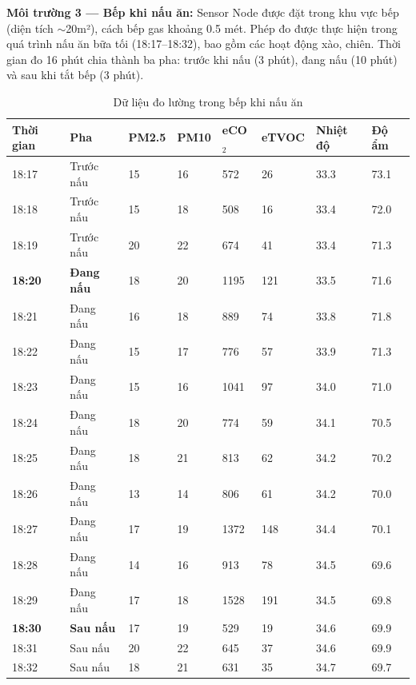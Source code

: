 \documentclass[../DoAn.tex]{subfiles}
\begin{document}
\textbf{Môi trường 3 — Bếp khi nấu ăn:} Sensor Node được đặt trong khu vực bếp (diện tích $\sim$20m²), cách bếp gas khoảng 0.5 mét. Phép đo được thực hiện trong quá trình nấu ăn bữa tối (18:17--18:32), bao gồm các hoạt động xào, chiên. Thời gian đo 16 phút chia thành ba pha: trước khi nấu (3 phút), đang nấu (10 phút) và sau khi tắt bếp (3 phút).

\begin{table}[H]
\centering
\caption{Dữ liệu đo lường trong bếp khi nấu ăn}
\label{table:thuc_nghiem_bep}
\small
\begin{tabularx}{\textwidth}{|X|X|X|X|X|X|X|X|}
\hline
\textbf{Thời gian} & \textbf{Pha} & \textbf{PM2.5} & \textbf{PM10} & \textbf{eCO$_2$} & \textbf{eTVOC} & \textbf{Nhiệt độ} & \textbf{Độ ẩm} \\
\hline
18:17 & Trước nấu & 15 & 16 & 572 & 26 & 33.3 & 73.1 \\
\hline
18:18 & Trước nấu & 15 & 18 & 508 & 16 & 33.4 & 72.0 \\
\hline
18:19 & Trước nấu & 20 & 22 & 674 & 41 & 33.4 & 71.3 \\
\hline
\textbf{18:20} & \textbf{Đang nấu} & 18 & 20 & 1195 & 121 & 33.5 & 71.6 \\
\hline
18:21 & Đang nấu & 16 & 18 & 889 & 74 & 33.8 & 71.8 \\
\hline
18:22 & Đang nấu & 15 & 17 & 776 & 57 & 33.9 & 71.3 \\
\hline
18:23 & Đang nấu & 15 & 16 & 1041 & 97 & 34.0 & 71.0 \\
\hline
18:24 & Đang nấu & 18 & 20 & 774 & 59 & 34.1 & 70.5 \\
\hline
18:25 & Đang nấu & 18 & 21 & 813 & 62 & 34.2 & 70.2 \\
\hline
18:26 & Đang nấu & 13 & 14 & 806 & 61 & 34.2 & 70.0 \\
\hline
18:27 & Đang nấu & 17 & 19 & 1372 & 148 & 34.4 & 70.1 \\
\hline
18:28 & Đang nấu & 14 & 16 & 913 & 78 & 34.5 & 69.6 \\
\hline
18:29 & Đang nấu & 17 & 18 & 1528 & 191 & 34.5 & 69.8 \\
\hline
\textbf{18:30} & \textbf{Sau nấu} & 17 & 19 & 529 & 19 & 34.6 & 69.9 \\
\hline
18:31 & Sau nấu & 20 & 22 & 645 & 37 & 34.6 & 69.9 \\
\hline
18:32 & Sau nấu & 18 & 21 & 631 & 35 & 34.7 & 69.7 \\
\hline
\end{tabularx}
\end{table}
\end{document}
